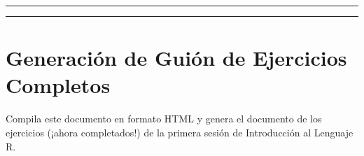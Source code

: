 \documentclass[
]{article}
\begin{document}
\begin{center}\rule{0.5\linewidth}{0.5pt}\end{center}

\begin{center}\rule{0.5\linewidth}{0.5pt}\end{center}

\hypertarget{generaciuxf3n-de-guiuxf3n-de-ejercicios-completos}{%
\section{Generación de Guión de Ejercicios
Completos}\label{generaciuxf3n-de-guiuxf3n-de-ejercicios-completos}}

Compila este documento en formato HTML y genera el documento de los
ejercicios (¡ahora completados!) de la primera sesión de Introducción al
Lenguaje R.
\end{document}
